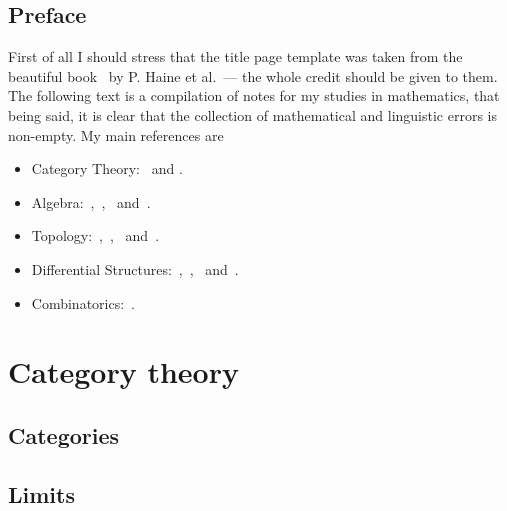 


\frontmatter



\tableofcontents
\listoftodos

\pagestyle{plain}

\chapter{Preface}

First of all I should stress that the title page template was taken from the
beautiful book~\cite{Haine21DiffCoho} by P. Haine et al.~--- the whole credit
should be given to them. The following text is a compilation of notes for my
studies in mathematics, that being said, it is clear that the collection of
mathematical and linguistic errors is non-empty. My main references are
\begin{itemize}\setlength\itemsep{0em}
\item Category Theory:~\cite{Rie16} and \cite{Shap06}.
\item Algebra:~\cite{Yu89},~\cite{Kim20},~\cite{Aluf09} and~\cite{Lang93}.
\item Topology:~\cite{Lee11},~\cite{Tai20},~\cite{Mun00} and~\cite{Eng89}.
\item Differential Structures:~\cite{Zor15},~\cite{Zor16},~\cite{Rud76}
  and~\cite{Jost06}.
\item Combinatorics:~\cite{Die16}.
\end{itemize}

\mainmatter

\part{Category theory}

\chapter{Categories}





\chapter{Limits}

